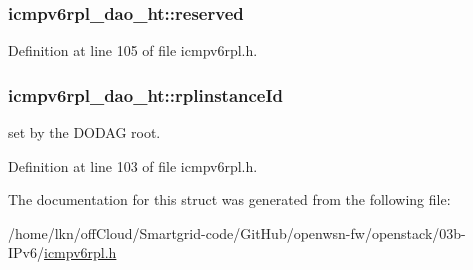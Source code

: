 \subsubsection[{\texorpdfstring{reserved}{reserved}}]{ icmpv6rpl\+\_\+dao\+\_\+ht\+::reserved}\hypertarget{structicmpv6rpl__dao__ht_ad3393e8819d79dcc901afc934ce8c3ef}{}\label{structicmpv6rpl__dao__ht_ad3393e8819d79dcc901afc934ce8c3ef}


Definition at line 105 of file icmpv6rpl.\+h.

\subsubsection[{\texorpdfstring{rplinstance\+Id}{rplinstanceId}}]{ icmpv6rpl\+\_\+dao\+\_\+ht\+::rplinstance\+Id}\hypertarget{structicmpv6rpl__dao__ht_a206c5a7e60c2feec5609449f09a1bc6c}{}\label{structicmpv6rpl__dao__ht_a206c5a7e60c2feec5609449f09a1bc6c}


set by the D\+O\+D\+AG root. 



Definition at line 103 of file icmpv6rpl.\+h.



The documentation for this struct was generated from the following file\+:\begin{DoxyCompactItemize}
\item 
/home/lkn/off\+Cloud/\+Smartgrid-\/code/\+Git\+Hub/openwsn-\/fw/openstack/03b-\/\+I\+Pv6/\hyperlink{icmpv6rpl_8h}{icmpv6rpl.\+h}\end{DoxyCompactItemize}

